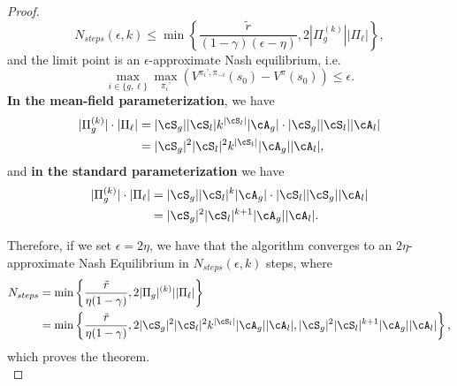 \documentclass{article}
\theoremstyle{plain}
\theoremstyle{definition}
\begin{document}
\begin{proof}
\[N_{steps}(\epsilon,k) \leq \min\left\{\frac{\tilde{r}}{(1-\gamma)(\epsilon-\eta)}, 2|\Pi_g^{(k)}||\Pi_\ell|\right\},\]
and the limit point is an $\epsilon$-approximate Nash equilibrium, i.e.
\[\max_{i\in\{g,\ell\}}\max_{\pi_i’}\left(V^{\pi_i’, \pi_{-i}}(s_0) - V^\pi(s_0)\right) \leq \epsilon.\]
\textbf{In the mean-field parameterization}, we have \begin{align*}|\Pi_g^{(k)}|\cdot |\Pi_\ell| &= |\cS_g| |\cS_l| k^{|\cS_l|}|\cA_g| \cdot |\cS_g||\cS_l||\cA_l| \\
&= |\cS_g|^2 |\cS_l|^2 k^{|\cS_l|} |\cA_g| |\cA_l|,
\end{align*}
and \textbf{in the standard parameterization} we have
\begin{align*}
    |\Pi_g^{(k)}|\cdot |\Pi_\ell| &= |\cS_g| |\cS_l|^k |\cA_g|\cdot |\cS_l||\cS_g||\cA_l| \\
    &= |\cS_g|^2 |\cS_l|^{k+1} |\cA_g| |\cA_l|. 
\end{align*}

Therefore, if we set $\epsilon = 2\eta$, we have that the algorithm converges to an $2\eta$-approximate Nash Equilibrium in $N_{steps}(\epsilon,k)$ steps, where \begin{align*}
N_{steps} &= \min\left\{\frac{\tilde{r}}{\eta(1-\gamma)}, 2|\Pi_g|^{(k)}| |\Pi_\ell |\right\} \\
&= \min\left\{\frac{\tilde{r}}{\eta(1-\gamma)}, 2|\cS_g|^2 |\cS_l|^2 k^{|\cS_l|} |\cA_g| |\cA_l|, |\cS_g|^2 |\cS_l|^{k+1} |\cA_g| |\cA_l| \right\},
\end{align*}
which proves the theorem.\qedhere\\
\end{proof}
\end{document}
